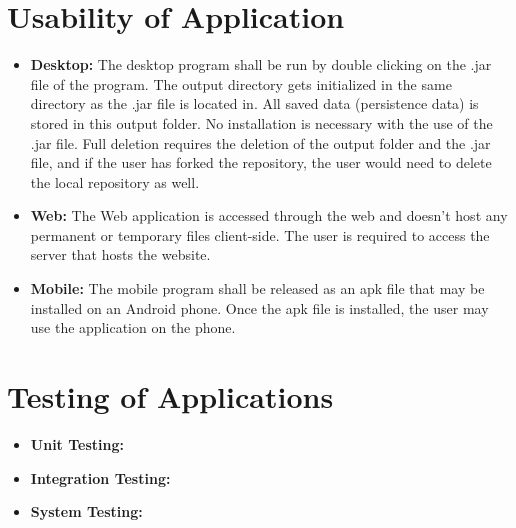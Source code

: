 \documentclass[12pt]{article}
\begin{document}
\section{Usability of Application}

\begin{itemize}
	\item \textbf{Desktop:} The desktop program shall be run by double clicking on the .jar file of the program. The output directory gets initialized in the same directory as the .jar file is located in. All saved data (persistence data) is stored in this output folder. No installation is necessary with the use of the .jar file. Full deletion requires the deletion of the output folder and the .jar file, and if the user has forked the repository, the user would need to delete the local repository as well.
	\item \textbf{Web:} The Web application is accessed through the web and doesn't host any permanent or temporary files client-side. The user is required to access the server that hosts the website.
	\item \textbf{Mobile:} The mobile program shall be released as an apk file that may be installed on an Android phone. Once the apk file is installed, the user may use the application on the phone. 
\end{itemize}

\section{Testing of Applications}
\begin{itemize}
	\item \textbf{Unit Testing:}
	\item \textbf{Integration Testing:}
	\item \textbf{System Testing:}
\end{itemize}
\end{document}
